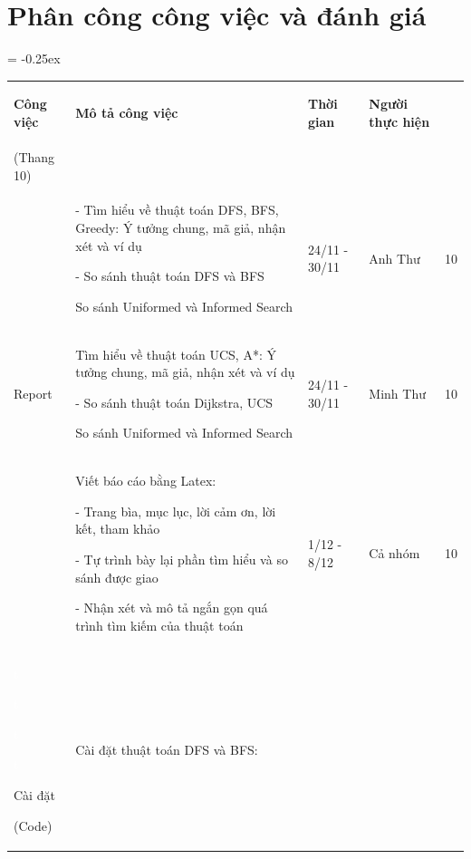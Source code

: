 \chapter*{\vspace{-3cm} \centering Phân công công việc và đánh giá}
\vspace{-1cm}
\begin{table}[H]
{
\centering
\extrarowheight = -0.25ex
\renewcommand{\arraystretch}{1.5}
\begin{tabular}{|m{1.5cm}|m{6.6cm}|m{2.4cm}|m{2cm}|m{2.7cm}|}
\hline
\rowcolor[RGB]{229,229,229} \begin{center}\textbf{Công việc}\end{center}& \centering\textbf{Mô tả công việc} & \centering\textbf{Thời gian} & \centering\textbf{Người thực hiện} & \begin{center}\textbf{Đánh giá\\(Thang 10)}\end{center} \\ \hline
   & - Tìm hiểu về thuật toán DFS, BFS, Greedy: Ý tưởng chung, mã giả, nhận xét và ví dụ \par
           - So sánh thuật toán DFS và BFS \par So sánh Uniformed và Informed Search & 24/11 - 30/11 & Anh Thư & \begin{center} 10 \end{center}\\ \cline{2-5}
    \centering Report & Tìm hiểu về thuật toán UCS, A*: Ý tưởng chung, mã giả, nhận xét và ví dụ \par
    - So sánh thuật toán Dijkstra, UCS \par So sánh Uniformed và Informed Search & 24/11 - 30/11 & Minh Thư & \begin{center} 10 \end{center} \\ \cline{2-5}
   & Viết báo cáo bằng Latex: \par
   - Trang bìa, mục lục, lời cảm ơn, lời kết, tham khảo \par
   - Tự trình bày lại phần tìm hiểu và so sánh được giao \par
   - Nhận xét và mô tả ngắn gọn quá trình tìm kiếm của thuật toán
   & 1/12 - 8/12 & Cả nhóm & \begin{center} 10 \end{center} \\ \hline
   \centering \textcolor{white}{t} \par \textcolor{white}{t} \par \textcolor{white}{t} \par \textcolor{white}{t} \par Cài đặt\par(Code) & Cài đặt thuật toán DFS và BFS: \par

\end{tabular}}
\end{table}
